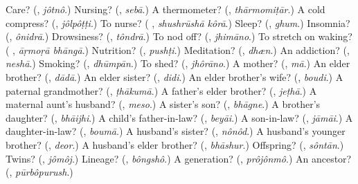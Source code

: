 \begin{tcolorbox}[breakable,colback=teal!4,colframe=teal!35!black,title={Before you move on}]
Care? (\textbf{}, \emph{jôtnô}.) Nursing? (\textbf{}, \emph{sebā}.) A thermometer? (\textbf{}, \emph{thārmomiṭār}.) A cold compress? (\textbf{}, \emph{jôlpôṭṭi}.) To nurse? (\textbf{ }, \emph{shushrūshā kôrā}.) Sleep? (\textbf{}, \emph{ghum}.) Insomnia? (\textbf{}, \emph{ônidrā}.) Drowsiness? (\textbf{}, \emph{tôndrā}.) To nod off? (\textbf{}, \emph{jhimāno}.) To stretch on waking? (\textbf{ }, \emph{āṛmoṛā bhāngā}.) Nutrition? (\textbf{}, \emph{pushṭi}.) Meditation? (\textbf{}, \emph{dhæn}.) An addiction? (\textbf{}, \emph{neshā}.) Smoking? (\textbf{}, \emph{dhūmpān}.) To shed? (\textbf{}, \emph{jhôrāno}.) A mother? (\textbf{}, \emph{mā}.) An elder brother? (\textbf{}, \emph{dādā}.) An elder sister? (\textbf{}, \emph{didi}.) An elder brother's wife? (\textbf{}, \emph{boudi}.) A paternal grandmother? (\textbf{}, \emph{ṭhākumā}.) A father's elder brother? (\textbf{}, \emph{jeṭhā}.) A maternal aunt's husband? (\textbf{}, \emph{meso}.) A sister's son? (\textbf{}, \emph{bhāgne}.) A brother's daughter? (\textbf{}, \emph{bhāijhi}.) A child's father-in-law? (\textbf{}, \emph{beyāi}.) A son-in-law? (\textbf{}, \emph{jāmāi}.) A daughter-in-law? (\textbf{}, \emph{boumā}.) A husband's sister? (\textbf{}, \emph{nônôd}.) A husband's younger brother? (\textbf{}, \emph{deor}.) A husband's elder brother? (\textbf{}, \emph{bhāshur}.) Offspring? (\textbf{}, \emph{sôntān}.) Twins? (\textbf{}, \emph{jômôj}.) Lineage? (\textbf{}, \emph{bôngshô}.) A generation? (\textbf{}, \emph{prôjônmô}.) An ancestor? (\textbf{}, \emph{pūrbôpurush}.)
\end{tcolorbox}
